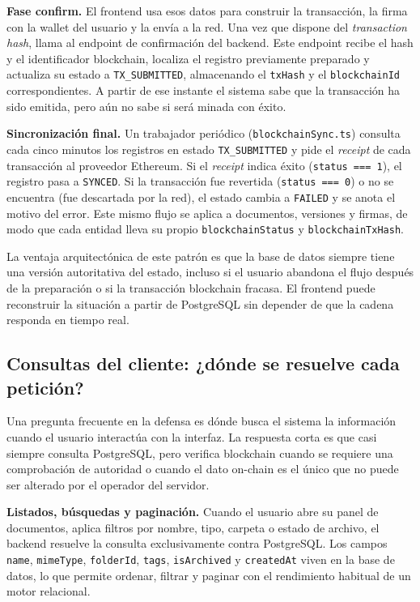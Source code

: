 \documentclass[11pt, a4paper]{article}
\begin{document}
\textbf{Fase confirm.} El frontend usa esos datos para construir la transacción, la firma con la wallet del usuario y la envía a la red. Una vez que dispone del \textit{transaction hash}, llama al endpoint de confirmación del backend. Este endpoint recibe el hash y el identificador blockchain, localiza el registro previamente preparado y actualiza su estado a \texttt{TX\_SUBMITTED}, almacenando el \texttt{txHash} y el \texttt{blockchainId} correspondientes. A partir de ese instante el sistema sabe que la transacción ha sido emitida, pero aún no sabe si será minada con éxito.

\textbf{Sincronización final.} Un trabajador periódico (\texttt{blockchainSync.ts}) consulta cada cinco minutos los registros en estado \texttt{TX\_SUBMITTED} y pide el \textit{receipt} de cada transacción al proveedor Ethereum. Si el \textit{receipt} indica éxito (\texttt{status === 1}), el registro pasa a \texttt{SYNCED}. Si la transacción fue revertida (\texttt{status === 0}) o no se encuentra (fue descartada por la red), el estado cambia a \texttt{FAILED} y se anota el motivo del error. Este mismo flujo se aplica a documentos, versiones y firmas, de modo que cada entidad lleva su propio \texttt{blockchainStatus} y \texttt{blockchainTxHash}.

La ventaja arquitectónica de este patrón es que la base de datos siempre tiene una versión autoritativa del estado, incluso si el usuario abandona el flujo después de la preparación o si la transacción blockchain fracasa. El frontend puede reconstruir la situación a partir de PostgreSQL sin depender de que la cadena responda en tiempo real.

\subsection{Consultas del cliente: ¿dónde se resuelve cada petición?}

Una pregunta frecuente en la defensa es dónde busca el sistema la información cuando el usuario interactúa con la interfaz. La respuesta corta es que casi siempre consulta PostgreSQL, pero verifica blockchain cuando se requiere una comprobación de autoridad o cuando el dato on-chain es el único que no puede ser alterado por el operador del servidor.

\textbf{Listados, búsquedas y paginación.} Cuando el usuario abre su panel de documentos, aplica filtros por nombre, tipo, carpeta o estado de archivo, el backend resuelve la consulta exclusivamente contra PostgreSQL. Los campos \texttt{name}, \texttt{mimeType}, \texttt{folderId}, \texttt{tags}, \texttt{isArchived} y \texttt{createdAt} viven en la base de datos, lo que permite ordenar, filtrar y paginar con el rendimiento habitual de un motor relacional.
\end{document}
